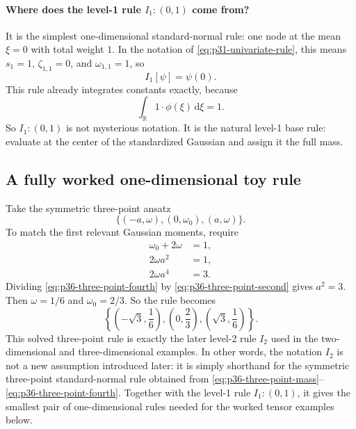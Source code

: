 \documentclass[11pt]{article}
\numberwithin{equation}{section}
\newcommand{\R}{\mathbb R}
\newcommand{\dd}{\,\mathrm d}
\begin{document}
\paragraph{Where does the level-1 rule \texorpdfstring{\(I_1:(0,1)\)}{I1:(0,1)} come from?}
It is the simplest one-dimensional standard-normal rule: one node at the mean
\(\xi=0\) with total weight \(1\).  In the notation of
\eqref{eq:p31-univariate-rule}, this means \(s_1=1\),
\(\zeta_{1,1}=0\), and \(\omega_{1,1}=1\), so
\[
  I_1[\psi]=\psi(0).
\]
This rule already integrates constants exactly, because
\[
  \int_{\R}1\cdot\phi(\xi)\dd\xi=1.
\]
So \(I_1:(0,1)\) is not mysterious notation.  It is the natural level-1 base
rule: evaluate at the center of the standardized Gaussian and assign it the full
mass.

\subsection{A fully worked one-dimensional toy rule}

Take the symmetric three-point ansatz
\begin{equation}
  \{(-a,\omega),(0,\omega_0),(a,\omega)\}.
  \label{eq:p36-three-point-ansatz}
\end{equation}
To match the first relevant Gaussian moments, require
\begin{align}
  \omega_0+2\omega &= 1,
  \label{eq:p36-three-point-mass}\\
  2\omega a^2 &= 1,
  \label{eq:p36-three-point-second}\\
  2\omega a^4 &= 3.
  \label{eq:p36-three-point-fourth}
\end{align}
Dividing \eqref{eq:p36-three-point-fourth} by
\eqref{eq:p36-three-point-second} gives \(a^2=3\).  Then
\(\omega=1/6\) and \(\omega_0=2/3\).  So the rule becomes
\begin{equation}
  \left\{\left(-\sqrt3,\frac16\right),\left(0,\frac23\right),
  \left(\sqrt3,\frac16\right)\right\}.
  \label{eq:p36-three-point-rule}
\end{equation}
This solved three-point rule is exactly the later level-2 rule \(I_2\) used in
the two-dimensional and three-dimensional examples.  In other words, the notation
\(I_2\) is not a new assumption introduced later: it is simply shorthand for the
symmetric three-point standard-normal rule obtained from
\eqref{eq:p36-three-point-mass}--\eqref{eq:p36-three-point-fourth}.  Together
with the level-1 rule \(I_1:(0,1)\), it gives the smallest pair of
one-dimensional rules needed for the worked tensor examples below.
\end{document}
